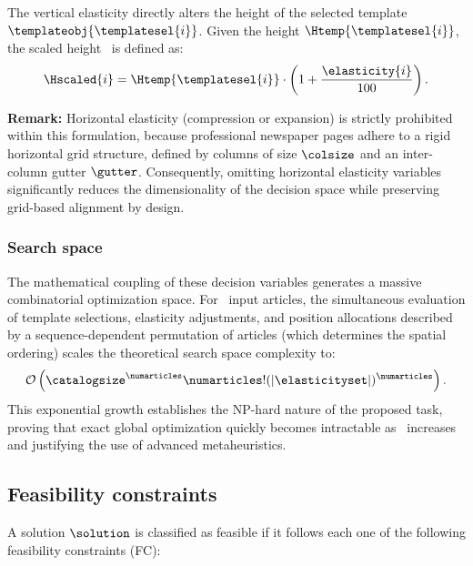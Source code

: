 \begin{enumerate}
    The vertical elasticity directly alters the height of the selected template $\templateobj{\templatesel{i}}$. Given the height $\Htemp{\templatesel{i}}$, the scaled height \ is defined as:
    \begin{equation}
    \Hscaled{i} = \Htemp{\templatesel{i}} \cdot \left(1 + \frac{\elasticity{i}}{100}\right).
    \label{eq:h-scaled}
    \end{equation}

    \textbf{Remark: } Horizontal elasticity (compression or expansion) is strictly prohibited within this formulation, because professional newspaper pages adhere to a rigid horizontal grid structure, defined by columns of size $\colsize$ and an inter-column gutter $\gutter$. Consequently, omitting horizontal elasticity variables significantly reduces the dimensionality of the decision space while preserving grid-based alignment by design.
\end{enumerate}



\subsubsection{Search space}
The mathematical coupling of these decision variables generates a massive combinatorial optimization space. For \numarticles\ input articles, the simultaneous evaluation of template selections,  elasticity adjustments, and position allocations described by a sequence-dependent permutation of articles (which determines the spatial ordering) scales the theoretical search space complexity to:
\begin{equation}
\mathcal{O}\left(\catalogsize^{\numarticles}  \numarticles!  (|\elasticityset|)^{\numarticles}\right).
\end{equation}
This exponential growth establishes the NP-hard nature of the proposed task, proving that exact global optimization quickly becomes intractable as \numarticles\ increases and justifying the use of advanced metaheuristics.





\subsection{Feasibility constraints}
\label{sec:constraints_space}

A solution $\solution$ is classified as feasible if it follows each one of the following feasibility constraints (FC):

